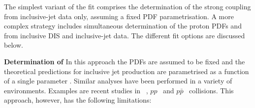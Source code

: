 The simplest variant of the fit comprises the determination of the strong coupling \asz from inclusive-jet data only, assuming a fixed PDF parametrisation. A more complex strategy includes simultaneous determination of the proton PDFs and \asz from inclusive DIS and inclusive-jet data. The different fit options are discussed below.
 
{\flushleft \textbf{Determination of \asz}}\newline
In this approach the PDFs are assumed to be fixed and the theoretical predictions for inclusive jet production are parametrised as a function of a single parameter \asz. Similar analyses have been performed in a variety of environments. Examples are recent studies in \ep~\cite{np:b864:1,epj:c75:65}, $pp$~\cite{CMS:2014mna,Chatrchyan:2013txa} and $p\bar{p}$~\cite{Affolder:2001hn,Abazov:2012lua,Abazov:2009nc} collisions. This approach, however, has the following limitations:
